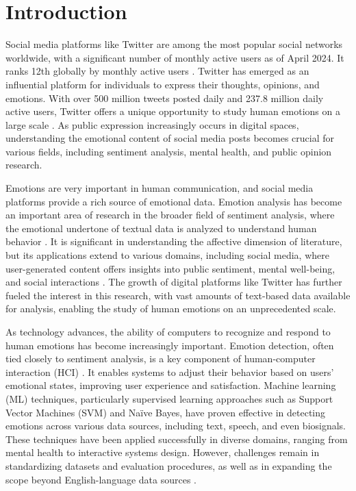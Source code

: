 
\section{Introduction}

Social media platforms like Twitter are among the most popular social networks worldwide, with a significant number of monthly active users as of April 2024. It ranks 12th globally by monthly active users \cite{statistica2023}. Twitter has emerged as an influential platform for individuals to express their thoughts, opinions, and emotions. With over 500 million tweets posted daily and 237.8 million daily active users, Twitter offers a unique opportunity to study human emotions on a large scale \cite{internetlivestats2023}\cite{twitterstats2023}. As public expression increasingly occurs in digital spaces, understanding the emotional content of social media posts becomes crucial for various fields, including sentiment analysis, mental health, and public opinion research.

Emotions are very important in human communication, and social media platforms provide a rich source of emotional data. Emotion analysis has become an important area of research in the broader field of sentiment analysis, where the emotional undertone of textual data is analyzed to understand human behavior \cite{Kim2019}. It is significant in understanding the affective dimension of literature, but its applications extend to various domains, including social media, where user-generated content offers insights into public sentiment, mental well-being, and social interactions \cite{Hakak2017}. The growth of digital platforms like Twitter has further fueled the interest in this research, with vast amounts of text-based data available for analysis, enabling the study of human emotions on an unprecedented scale.

As technology advances, the ability of computers to recognize and respond to human emotions has become increasingly important. Emotion detection, often tied closely to sentiment analysis, is a key component of human-computer interaction (HCI) \cite{Alslaity2022}. It enables systems to adjust their behavior based on users' emotional states, improving user experience and satisfaction. Machine learning (ML) techniques, particularly supervised learning approaches such as Support Vector Machines (SVM) and Naïve Bayes, have proven effective in detecting emotions across various data sources, including text, speech, and even biosignals. These techniques have been applied successfully in diverse domains, ranging from mental health to interactive systems design. However, challenges remain in standardizing datasets and evaluation procedures, as well as in expanding the scope beyond English-language data sources \cite{Alslaity2022}.

